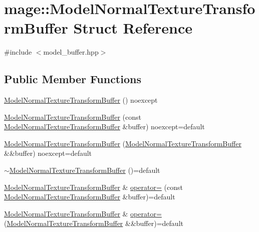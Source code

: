 \hypertarget{structmage_1_1_model_normal_texture_transform_buffer}{}\section{mage\+:\+:Model\+Normal\+Texture\+Transform\+Buffer Struct Reference}
\label{structmage_1_1_model_normal_texture_transform_buffer}


{\ttfamily \#include $<$model\+\_\+buffer.\+hpp$>$}

\subsection*{Public Member Functions}
\begin{DoxyCompactItemize}
\item 
\hyperlink{structmage_1_1_model_normal_texture_transform_buffer_a0c5eafca7db1fd43752484090ebcf4ab}{Model\+Normal\+Texture\+Transform\+Buffer} () noexcept
\item 
\hyperlink{structmage_1_1_model_normal_texture_transform_buffer_a5e8fd0dca3dbc3df825dae563ee327b6}{Model\+Normal\+Texture\+Transform\+Buffer} (const \hyperlink{structmage_1_1_model_normal_texture_transform_buffer}{Model\+Normal\+Texture\+Transform\+Buffer} \&buffer) noexcept=default
\item 
\hyperlink{structmage_1_1_model_normal_texture_transform_buffer_aac8f942f736ffb92ad9e007bd63df9da}{Model\+Normal\+Texture\+Transform\+Buffer} (\hyperlink{structmage_1_1_model_normal_texture_transform_buffer}{Model\+Normal\+Texture\+Transform\+Buffer} \&\&buffer) noexcept=default
\item 
\hyperlink{structmage_1_1_model_normal_texture_transform_buffer_a5b37f45ead4f5b40e2d9de8ef116a057}{$\sim$\+Model\+Normal\+Texture\+Transform\+Buffer} ()=default
\item 
\hyperlink{structmage_1_1_model_normal_texture_transform_buffer}{Model\+Normal\+Texture\+Transform\+Buffer} \& \hyperlink{structmage_1_1_model_normal_texture_transform_buffer_a5ce1f572ceecdb53b66d6f3f8f03e5f8}{operator=} (const \hyperlink{structmage_1_1_model_normal_texture_transform_buffer}{Model\+Normal\+Texture\+Transform\+Buffer} \&buffer)=default
\item 
\hyperlink{structmage_1_1_model_normal_texture_transform_buffer}{Model\+Normal\+Texture\+Transform\+Buffer} \& \hyperlink{structmage_1_1_model_normal_texture_transform_buffer_aa5c10733681849e37988a9d1bf75a637}{operator=} (\hyperlink{structmage_1_1_model_normal_texture_transform_buffer}{Model\+Normal\+Texture\+Transform\+Buffer} \&\&buffer)=default
\end{DoxyCompactItemize}
